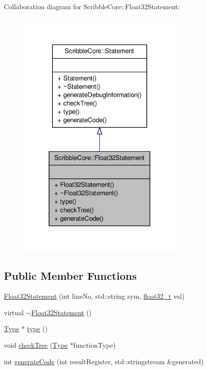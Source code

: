 Collaboration diagram for Scribble\-Core\-:\-:Float32\-Statement\-:
\nopagebreak
\begin{figure}[H]
\begin{center}
\leavevmode
\includegraphics[width=236pt]{class_scribble_core_1_1_float32_statement__coll__graph}
\end{center}
\end{figure}
\subsection*{Public Member Functions}
\begin{DoxyCompactItemize}
\item 
\hyperlink{class_scribble_core_1_1_float32_statement_ab66923b22e1fb3efdac02f4f50f253ce}{Float32\-Statement} (int line\-No, std\-::string sym, \hyperlink{types_8h_a4611b605e45ab401f02cab15c5e38715}{float32\-\_\-t} val)
\item 
virtual \hyperlink{class_scribble_core_1_1_float32_statement_a5a2344e3ca18671779460f53d121621d}{$\sim$\-Float32\-Statement} ()
\item 
\hyperlink{class_scribble_core_1_1_type}{Type} $\ast$ \hyperlink{class_scribble_core_1_1_float32_statement_ac9a00240c3eec2c34ffdbf2d4a91e564}{type} ()
\item 
void \hyperlink{class_scribble_core_1_1_float32_statement_afafd2fd9fdc1c02258a62e1063f2d0ff}{check\-Tree} (\hyperlink{class_scribble_core_1_1_type}{Type} $\ast$function\-Type)
\item 
int \hyperlink{class_scribble_core_1_1_float32_statement_ab920c6d8f9928af7f23b03158a4126a3}{generate\-Code} (int result\-Register, std\-::stringstream \&generated)
\end{DoxyCompactItemize}


